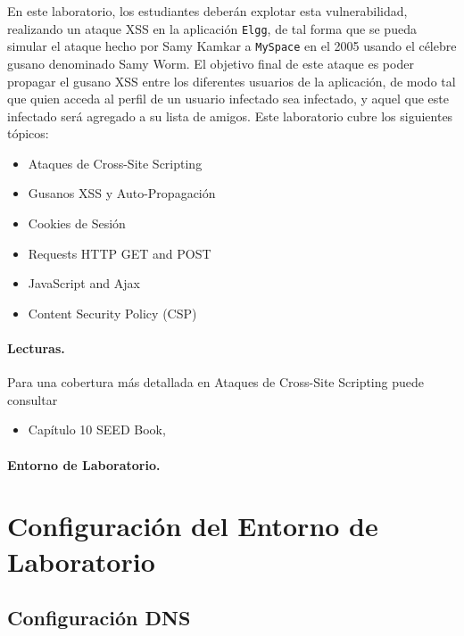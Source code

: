 En este laboratorio, los estudiantes deberán explotar esta vulnerabilidad, realizando un ataque XSS en la aplicación {\tt Elgg}, de tal forma que se pueda simular el ataque hecho por Samy Kamkar a {\tt MySpace} en el 2005 usando el célebre gusano denominado Samy Worm.
El objetivo final de este ataque es poder propagar el gusano XSS entre los diferentes usuarios de la aplicación, de modo tal que quien acceda al perfil de un usuario infectado sea infectado, y aquel que este infectado será agregado a su lista de amigos. Este laboratorio cubre los siguientes tópicos:

\begin{itemize}[noitemsep]
 \item Ataques de Cross-Site Scripting
 \item Gusanos XSS y Auto-Propagación
 \item Cookies de Sesión
 \item Requests HTTP GET and POST
 \item JavaScript and Ajax
 \item Content Security Policy (CSP) 
\end{itemize}


\paragraph{Lecturas.}
Para una cobertura más detallada en Ataques de Cross-Site Scripting puede consultar 
\begin{itemize}
\item Capítulo 10 SEED Book, \seedbook
\end{itemize}


\paragraph{Entorno de Laboratorio.} 
\seedenvironmentB  
\nodependency


\section{Configuración del Entorno de Laboratorio}


\subsection{Configuración DNS} 

